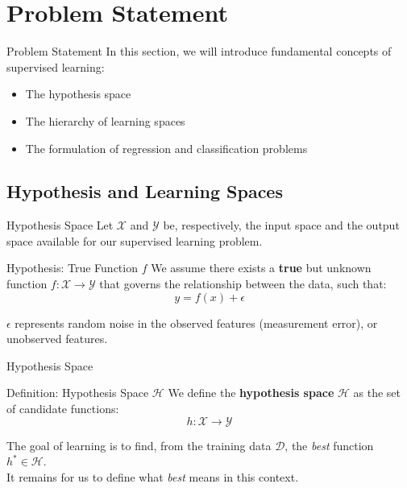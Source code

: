 \section[Problem Statement]{Problem Statement}
\begin{frame}{Problem Statement}
	In this section, we will introduce fundamental concepts of supervised learning:
	\begin{itemize}
		\item The hypothesis space
		\item The hierarchy of learning spaces
		\item The formulation of regression and classification problems
	\end{itemize}
\end{frame}

\subsection[Spaces]{Hypothesis and Learning Spaces}

\begin{frame}{Hypothesis Space}
	Let $\mathcal{X}$ and $\mathcal{Y}$ be, respectively, the input space and the output space available for our supervised learning problem.
	\begin{block}{Hypothesis: True Function $f$}
		We assume there exists a \textbf{true} but unknown function $f: \mathcal{X} \rightarrow \mathcal{Y}$ that governs the relationship between the data, such that:
		\begin{equation}
			y = f(x) + \epsilon
			\nonumber
		\end{equation}
		\hfill
	\end{block}
	$\epsilon$ represents random noise in the observed features (measurement error), or unobserved features.
\end{frame}

\begin{frame}{Hypothesis Space}
	\begin{block}{Definition: Hypothesis Space $\mathcal{H}$}
		We define the \textbf{hypothesis space} $\mathcal{H}$ as the set of candidate functions:
		\begin{equation}
			h: \mathcal{X} \rightarrow \mathcal{Y}
			\nonumber
		\end{equation}
		\hfill
	\end{block}
	The goal of learning is to find, from the training data $\mathcal{D}$, the \textit{best} function $h^* \in \mathcal{H}$. \\
	\vspace{0.5cm}
	It remains for us to define what \textit{best} means in this context.
\end{frame}

